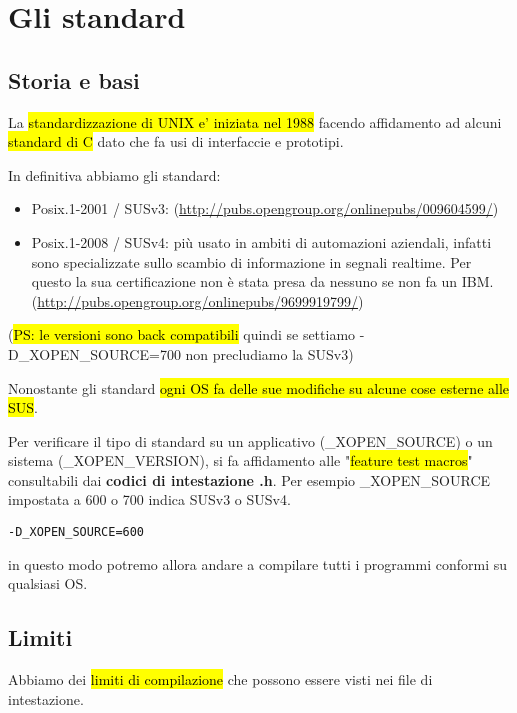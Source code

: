\newpage
\section{Gli standard}

\subsection{Storia e basi}

La \hl{standardizzazione di UNIX e' iniziata nel 1988} facendo affidamento ad alcuni \hl{standard di C} dato che fa usi di interfaccie e prototipi.

In definitiva abbiamo gli standard:

\begin{itemize}
	\item Posix.1-2001 / SUSv3: (\url{http://pubs.opengroup.org/onlinepubs/009604599/})
	\item Posix.1-2008 / SUSv4:  più usato in ambiti di automazioni aziendali, infatti sono specializzate sullo scambio di informazione in segnali realtime. Per questo la sua certificazione non è stata presa da nessuno se non fa un IBM. (\url{http://pubs.opengroup.org/onlinepubs/9699919799/})
\end{itemize}

(\hl{PS: le versioni sono back compatibili} quindi se settiamo -D\_XOPEN\_SOURCE=700 non precludiamo la SUSv3)

Nonostante gli standard \hl{ogni OS fa delle sue modifiche su alcune cose esterne alle SUS}.

Per verificare il tipo di standard su un applicativo (\_XOPEN\_SOURCE) o un sistema (\_XOPEN\_VERSION), si fa affidamento alle "\hl{feature test macros}" consultabili dai \textbf{codici di intestazione .h}. Per esempio \_XOPEN\_SOURCE impostata a 600 o 700 indica SUSv3 o SUSv4.

\begin{lstlisting}
-D_XOPEN_SOURCE=600
\end{lstlisting}

in questo modo potremo allora andare a compilare tutti i programmi conformi su qualsiasi OS.


\subsection{Limiti}

Abbiamo dei \hl{limiti di compilazione} che possono essere visti nei file di intestazione.

